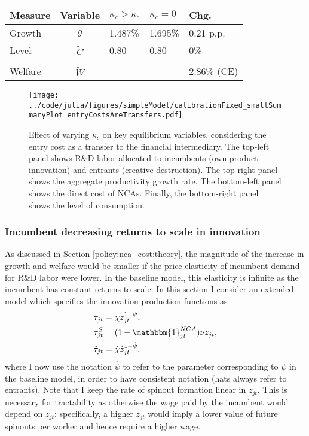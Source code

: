 \documentclass[ecta,nameyear,final]{econsocart}
\theoremstyle{definition}
\begin{document}
\begin{table}
	\centering
	\label{reducing_kappa_c_table_entryCostsAsTransfers}
	\begin{tabular}{lclll}
		\toprule \toprule
		Measure & Variable & $\kappa_c > \bar{\kappa}_c$ & $\kappa_c = 0$ & Chg. \tabularnewline
		\midrule
		Growth & $g$ & 1.487\% & 1.695\% & 0.21 p.p. \tabularnewline
		Level & $\tilde{C}$  & 0.80 &  0.80 & 0\% \tabularnewline 
		\tabularnewline
		Welfare & $\tilde{W}$  &  & & 2.86\% (CE)  \tabularnewline
		\bottomrule
	\end{tabular}
\end{table}


\begin{figure}[]
	\centering
	\texttt{[image: ../code/julia/figures/simpleModel/calibrationFixed\_smallSummaryPlot\_entryCostsAreTransfers.pdf]}
	\caption{Effect of varying $\kappa_c$ on key equilibrium variables, considering the entry cost as a transfer to the financial intermediary. The top-left panel shows R\&D labor allocated to incumbents (own-product innovation) and entrants (creative destruction). The top-right panel shows the aggregate productivity growth rate. The bottom-left panel shows the direct cost of NCAs. Finally, the bottom-right panel shows the level of consumption.}
	\label{calibration_smallSummaryPlot_entryCostsAsTransfers}
\end{figure}

\subsubsection{Incumbent decreasing returns to scale in innovation}

As discussed in Section \ref{policy:nca_cost:theory}, the magnitude of the increase in growth and welfare would be smaller if the price-elasticity of incumbent demand for R\&D labor were lower. In the baseline model, this elasticity is infinite as the incumbent has constant returns to scale. In this section I consider an extended model which specifies the innovation production functions as 
\begin{align}
	\tau_{jt} &= \chi z_{jt}^{1-\psi}, \\
	\tau^S_{jt} &= (1 - \mathbbm{1}^{NCA}_{jt}) \nu z_{jt}, \\
	\hat{\tau}_{jt} &= \hat{\chi} \hat{z}_{jt}^{1-\hat{\psi}},
\end{align}
where I now use the notation $\hat{\psi}$ to refer to the parameter corresponding to $\psi$ in the baseline model, in order to have consistent notation (hats always refer to entrants). Note that I keep the rate of spinout formation linear in $z_{jt}$. This is necessary for tractability as otherwise the wage paid by the incumbent would depend on $z_{jt}$: specifically, a higher $z_{jt}$ would imply a lower value of future spinouts per worker and hence require a higher wage. 
\end{document}
